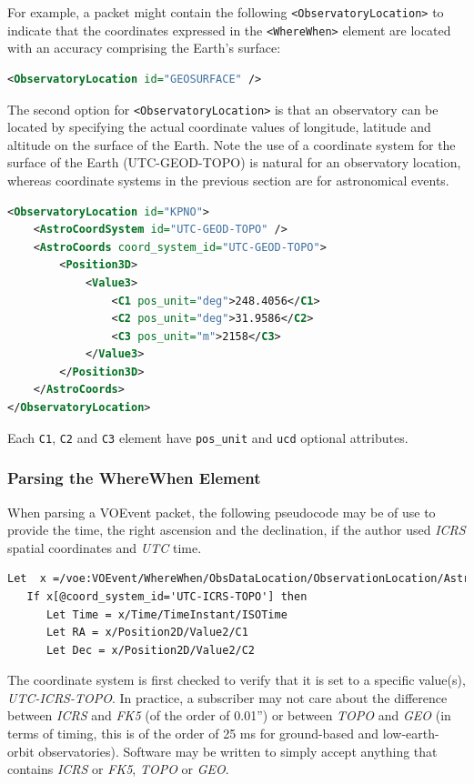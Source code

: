 \documentclass[11pt,a4paper]{ivoa}
\begin{document}
For example, a packet might contain the following {\tt <ObservatoryLocation>} to indicate that the coordinates expressed in the {\tt <WhereWhen>} element are located with an accuracy comprising the Earth's surface: 
\begin{lstlisting}[language=XML]
<ObservatoryLocation id="GEOSURFACE" /> 
\end{lstlisting}

The second option for {\tt <ObservatoryLocation>} is that an observatory can be located by specifying the actual coordinate values of longitude, latitude and altitude on the surface of the Earth. Note the use of a coordinate system for the surface of the Earth (UTC-GEOD-TOPO) is natural for an observatory location, whereas coordinate systems in the previous section are for astronomical events. 
\begin{lstlisting}[language=XML]
<ObservatoryLocation id="KPNO">
    <AstroCoordSystem id="UTC-GEOD-TOPO" />
    <AstroCoords coord_system_id="UTC-GEOD-TOPO">
        <Position3D>
            <Value3>
                <C1 pos_unit="deg">248.4056</C1>
                <C2 pos_unit="deg">31.9586</C2>
                <C3 pos_unit="m">2158</C3>
            </Value3>
        </Position3D>
    </AstroCoords>
</ObservatoryLocation> 
\end{lstlisting}

Each {\tt C1}, {\tt C2} and {\tt C3} element have {\tt pos\_unit} and {\tt ucd} optional attributes. 

\subsubsection{Parsing the WhereWhen Element}
\label{sec:3.4.3}
When parsing a VOEvent packet, the following pseudocode may be of use to provide the time, the right ascension and the declination, if the author used \emph{ICRS} spatial coordinates and \emph{UTC} time. 
\begin{lstlisting}[language=XML]
Let  x =/voe:VOEvent/WhereWhen/ObsDataLocation/ObservationLocation/AstroCoords
   If x[@coord_system_id='UTC-ICRS-TOPO'] then
      Let Time = x/Time/TimeInstant/ISOTime
      Let RA = x/Position2D/Value2/C1
      Let Dec = x/Position2D/Value2/C2 
\end{lstlisting}

The coordinate system is first checked to verify that it is set to a specific value(s), \emph{UTC-ICRS-TOPO}. In practice, a subscriber may not care about the difference between \emph{ICRS} and \emph{FK5} (of the order of 0.01'') or between \emph{TOPO} and \emph{GEO} (in terms of timing, this is of the order of 25 ms for ground-based and low-earth-orbit observatories). Software may be written to simply accept anything that contains \emph{ICRS} or \emph{FK5}, \emph{TOPO} or \emph{GEO}. 
\end{document}
